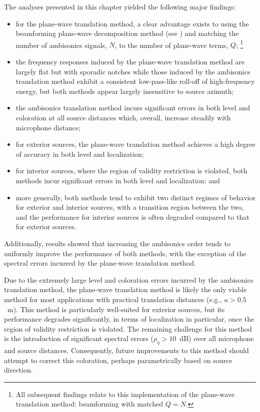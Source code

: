 The analyses presented in this chapter yielded the following major findings:
\begin{itemize}
\item for the plane-wave translation method, a clear advantage exists to using the beamforming plane-wave decomposition method (see ) and matching the number of ambisonics signals, $N$, to the number of plane-wave terms, $Q$;%
\footnote{All subsequent findings relate to this implementation of the plane-wave translation method: beamforming with matched $Q = N$.}
\item the frequency responses induced by the plane-wave translation method are largely flat but with sporadic notches while those induced by the ambisonics translation method exhibit a consistent low-pass-like roll-off of high-frequency energy, but both methods appear largely insensitive to source azimuth;
\item the ambisonics translation method incurs significant errors in both level and coloration at all source distances which, overall, increase steadily with microphone distance;
\item for exterior sources, the plane-wave translation method achieves a high degree of accuracy in both level and localization;
\item for interior sources, where the region of validity restriction is violated, both methods incur significant errors in both level and localization; and
\item more generally, both methods tend to exhibit two distinct regimes of behavior for exterior and interior sources, with a transition region between the two, and the performance for interior sources is often degraded compared to that for exterior sources.
\end{itemize}
Additionally, results showed that increasing the ambisonics order tends to uniformly improve the performance of both methods, with the exception of the spectral errors incurred by the plane-wave translation method.

Due to the extremely large level and coloration errors incurred by the ambisonics translation method, the plane-wave translation method is likely the only viable method for most applications with practical translation distances (e.g., $u > 0.5$~m).
This method is particularly well-suited for exterior sources, but its performance degrades significantly, in terms of localization in particular, once the region of validity restriction is violated.
The remaining challenge for this method is the introduction of significant spectral errors ($\rho_\eta > 10$~dB) over all microphone and source distances.
Consequently, future improvements to this method should attempt to correct this coloration, perhaps parametrically based on source direction.

